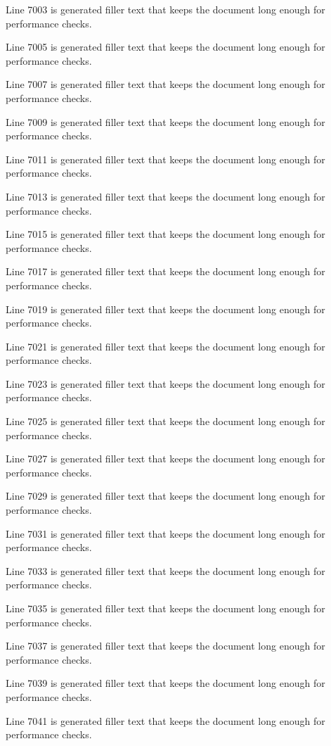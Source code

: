 Line 7003 is generated filler text that keeps the document long enough for performance checks.

Line 7005 is generated filler text that keeps the document long enough for performance checks.

Line 7007 is generated filler text that keeps the document long enough for performance checks.

Line 7009 is generated filler text that keeps the document long enough for performance checks.

Line 7011 is generated filler text that keeps the document long enough for performance checks.

Line 7013 is generated filler text that keeps the document long enough for performance checks.

Line 7015 is generated filler text that keeps the document long enough for performance checks.

Line 7017 is generated filler text that keeps the document long enough for performance checks.

Line 7019 is generated filler text that keeps the document long enough for performance checks.

Line 7021 is generated filler text that keeps the document long enough for performance checks.

Line 7023 is generated filler text that keeps the document long enough for performance checks.

Line 7025 is generated filler text that keeps the document long enough for performance checks.

Line 7027 is generated filler text that keeps the document long enough for performance checks.

Line 7029 is generated filler text that keeps the document long enough for performance checks.

Line 7031 is generated filler text that keeps the document long enough for performance checks.

Line 7033 is generated filler text that keeps the document long enough for performance checks.

Line 7035 is generated filler text that keeps the document long enough for performance checks.

Line 7037 is generated filler text that keeps the document long enough for performance checks.

Line 7039 is generated filler text that keeps the document long enough for performance checks.

Line 7041 is generated filler text that keeps the document long enough for performance checks.

